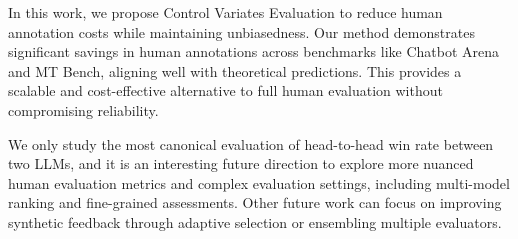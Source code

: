 In this work, we propose Control Variates Evaluation to reduce human annotation costs while maintaining unbiasedness. Our method demonstrates significant savings in human annotations across benchmarks like Chatbot Arena and MT Bench, aligning well with theoretical predictions. This provides a scalable and cost-effective alternative to full human evaluation without compromising reliability.

We only study the most canonical evaluation of head-to-head win rate between two LLMs, and it is an interesting future direction to explore more nuanced human evaluation metrics and complex evaluation settings, including multi-model ranking and fine-grained assessments.  Other future work can focus on improving synthetic feedback through adaptive selection or ensembling multiple evaluators. 





